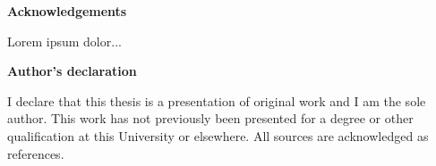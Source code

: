\thispagestyle{plain}
\begin{center}
    \Large        
    \textbf{Acknowledgements}
    \vspace{0.9cm}

\end{center}



Lorem ipsum dolor...


\newpage 

\thispagestyle{plain}
\begin{center}
    \Large        
    \textbf{Author's declaration}
    \vspace{0.9cm}

\end{center}


I declare that this thesis is a presentation of original work and I am the sole author. This work has not previously been presented for a degree or other qualification at this University or elsewhere. All sources are acknowledged as references.
